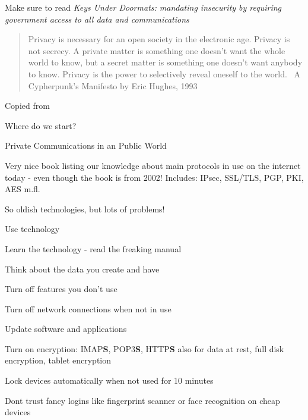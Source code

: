\documentclass[20pt,landscape,a4paper,footrule]{foils}
\begin{document}
Make sure to read \emph{Keys Under Doormats:
mandating insecurity by requiring government access to all data and communications}







\begin{quote}
	Privacy is necessary for an open society in the electronic age. Privacy is not secrecy. A private matter is something one doesn't want the whole world to know, but a secret matter is something one doesn't want anybody to know. Privacy is the power to selectively reveal oneself to the world. ~A Cypherpunk's Manifesto by Eric Hughes, 1993
\end{quote}

Copied from 


Where do we start?

\centerline{Private Communications in an Public World}

Very nice book listing our knowledge about main protocols in use on the internet today - even though the book is from 2002! Includes: IPsec, SSL/TLS, PGP, PKI, AES m.fl.

So oldish technologies, but lots of problems!



\begin{list1}
\item Use technology
\item Learn the technology - read the freaking manual
\item Think about the data you create and have
\begin{list2}
\item Turn off features you don't use
\item Turn off network connections when not in use
\item Update software and applications
\item Turn on encryption: IMAP{\bf S}, POP3{\bf S},
  HTTP{\bf S} also for data at rest, full disk encryption, tablet encryption
\item Lock devices automatically when not used for 10 minutes
\item Dont trust fancy logins like fingerprint scanner or face recognition on cheap devices
\end{list2}
\end{list1}
\end{document}
